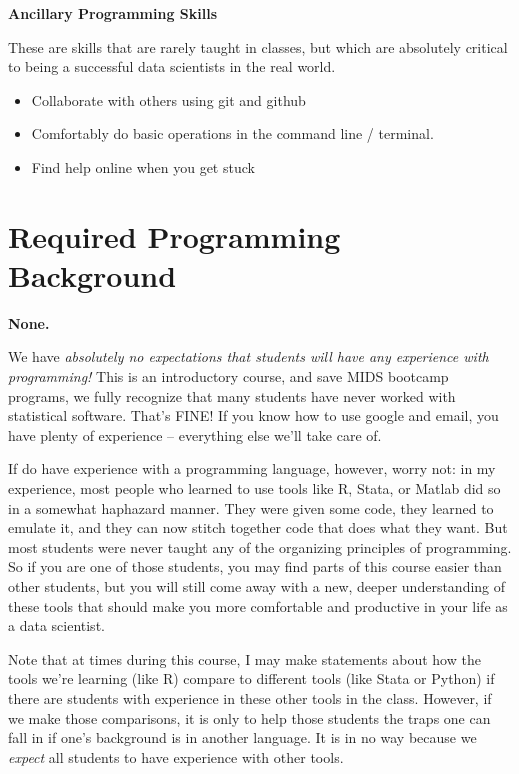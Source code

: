 \documentclass[12pt]{article}
\begin{document}
\textbf{Ancillary Programming Skills}

These are skills that are rarely taught in classes, but which are absolutely critical to being a successful data scientists in the real world.

\begin{itemize}
	\item Collaborate with others using git and github
	\item Comfortably do basic operations in the command line / terminal.
	\item Find help online when you get stuck
\end{itemize}

\section{Required Programming Background}

{\color{red}\textbf{None.}}

We have \emph{absolutely no expectations that students will have any experience with programming!} This is an introductory course, and save MIDS bootcamp programs, we fully recognize that many students have never worked with statistical software. That's FINE! If you know how to use google and email, you have plenty of experience -- everything else we'll take care of.

If do have experience with a programming language, however, worry not: in my experience, most people who learned to use tools like R, Stata, or Matlab did so in a somewhat haphazard manner. They were given some code, they learned to emulate it, and they can now stitch together code that does what they want. But most students were never taught any of the organizing principles of programming. So if you are one of those students, you may find parts of this course easier than other students, but you will still come away with a new, deeper understanding of these tools that should make you more comfortable and productive in your life as a data scientist.

Note that at times during this course, I may make statements about how the tools we're learning (like R) compare to different tools (like Stata or Python) if there are students with experience in these other tools in the class. However, if we make those comparisons, it is only to help those students the traps one can fall in if one's background is in another language. It is in no way because we \emph{expect} all students to have experience with other tools.
\end{document}
